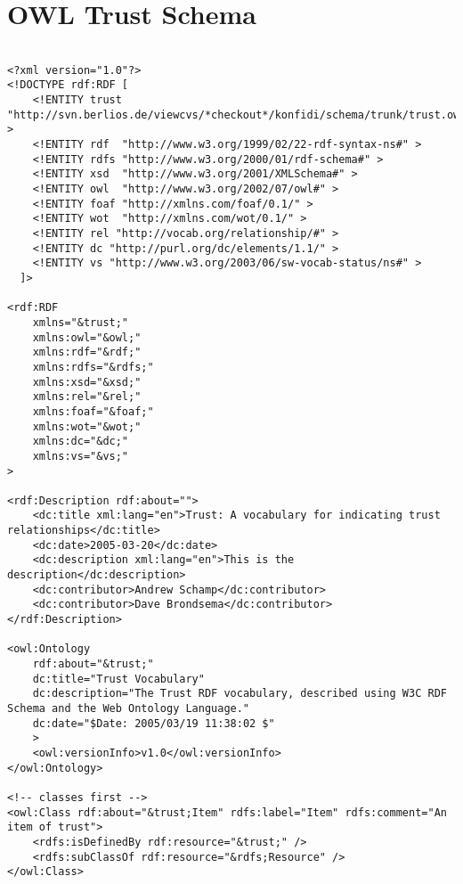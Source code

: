 \documentclass[onecolumn]{acm_proc_article-sp}
\begin{document}

  

%
%

\onecolumn

\appendix

\section{OWL Trust Schema}
\label{schemaCode}

\begin{verbatim}

<?xml version="1.0"?>
<!DOCTYPE rdf:RDF [
    <!ENTITY trust "http://svn.berlios.de/viewcvs/*checkout*/konfidi/schema/trunk/trust.owl#" >
    <!ENTITY rdf  "http://www.w3.org/1999/02/22-rdf-syntax-ns#" >
    <!ENTITY rdfs "http://www.w3.org/2000/01/rdf-schema#" >
    <!ENTITY xsd  "http://www.w3.org/2001/XMLSchema#" >
    <!ENTITY owl  "http://www.w3.org/2002/07/owl#" >
    <!ENTITY foaf "http://xmlns.com/foaf/0.1/" >
    <!ENTITY wot  "http://xmlns.com/wot/0.1/" >
    <!ENTITY rel "http://vocab.org/relationship/#" >
    <!ENTITY dc "http://purl.org/dc/elements/1.1/" >
    <!ENTITY vs "http://www.w3.org/2003/06/sw-vocab-status/ns#" >
  ]>

<rdf:RDF 
    xmlns="&trust;"
    xmlns:owl="&owl;" 
    xmlns:rdf="&rdf;" 
    xmlns:rdfs="&rdfs;"
    xmlns:xsd="&xsd;"
    xmlns:rel="&rel;"
    xmlns:foaf="&foaf;"
    xmlns:wot="&wot;"
    xmlns:dc="&dc;"
    xmlns:vs="&vs;"
>

<rdf:Description rdf:about="">
    <dc:title xml:lang="en">Trust: A vocabulary for indicating trust relationships</dc:title>
    <dc:date>2005-03-20</dc:date>
    <dc:description xml:lang="en">This is the description</dc:description>
    <dc:contributor>Andrew Schamp</dc:contributor>
    <dc:contributor>Dave Brondsema</dc:contributor>
</rdf:Description>

<owl:Ontology 
    rdf:about="&trust;" 
    dc:title="Trust Vocabulary" 
    dc:description="The Trust RDF vocabulary, described using W3C RDF Schema and the Web Ontology Language." 
    dc:date="$Date: 2005/03/19 11:38:02 $"
    > 
    <owl:versionInfo>v1.0</owl:versionInfo>
</owl:Ontology>

<!-- classes first -->
<owl:Class rdf:about="&trust;Item" rdfs:label="Item" rdfs:comment="An item of trust">
    <rdfs:isDefinedBy rdf:resource="&trust;" />
    <rdfs:subClassOf rdf:resource="&rdfs;Resource" />
</owl:Class>


\end{verbatim}
\end{document}
